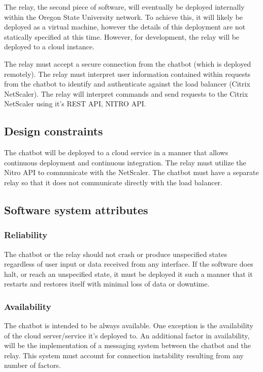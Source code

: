 \documentclass[onecolumn, draftclsnofoot,10pt, compsoc]{IEEEtran}
\begin{document}
The relay, the second piece of software, will eventually be deployed internally within the Oregon State University network.
To achieve this, it will likely be deployed as a virtual machine, however the details of this deployment are not statically specified at this time.
However, for development, the relay will be deployed to a cloud instance.

The relay must accept a secure connection from the chatbot (which is deployed remotely).
The relay must interpret user information contained within requests from the chatbot to identify and authenticate against the load balancer (Citrix NetScaler).
The relay will interpret commands and send requests to the Citrix NetScaler using it's REST API, NITRO API.

\subsection{Design constraints}
The chatbot will be deployed to a cloud service in a manner that allows continuous deployment and continuous integration. 
The relay must utilize the Nitro API to communicate with the NetScaler. 
The chatbot must have a separate relay so that it does not communicate directly with the load balancer.

\subsection{Software system attributes}

\subsubsection{Reliability}
The chatbot or the relay should not crash or produce unspecified states regardless of user input or data received from any interface. 
If the software does halt, or reach an unspecified state, it must be deployed it such a manner that it restarts and restores itself with minimal loss of data or downtime.

\subsubsection{Availability}
The chatbot is intended to be always available.
One exception is the availability of the cloud server/service it's deployed to.
An additional factor in availability, will be the implementation of a messaging system between the chatbot and the relay.
This system must account for connection instability resulting from any number of factors.
\end{document}
